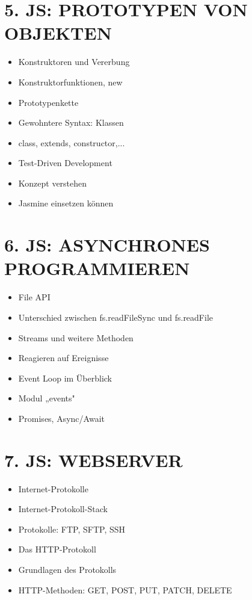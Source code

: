 \documentclass[10pt]{article}
\begin{document}
\section*{5. JS: PROTOTYPEN VON OBJEKTEN}
\begin{itemize}
  \item Konstruktoren und Vererbung
  \item Konstruktorfunktionen, new
  \item Prototypenkette
  \item Gewohntere Syntax: Klassen
  \item class, extends, constructor,...
  \item Test-Driven Development
  \item Konzept verstehen
  \item Jasmine einsetzen können
\end{itemize}

\section*{6. JS: ASYNCHRONES PROGRAMMIEREN}
\begin{itemize}
  \item File API
  \item Unterschied zwischen fs.readFileSync und fs.readFile
  \item Streams und weitere Methoden
  \item Reagieren auf Ereignisse
  \item Event Loop im Überblick
  \item Modul „events"
  \item Promises, Async/Await
\end{itemize}

\section*{7. JS: WEBSERVER}
\begin{itemize}
  \item Internet-Protokolle
  \item Internet-Protokoll-Stack
  \item Protokolle: FTP, SFTP, SSH
  \item Das HTTP-Protokoll
  \item Grundlagen des Protokolls
  \item HTTP-Methoden: GET, POST, PUT, PATCH, DELETE
\end{itemize}
\end{document}
